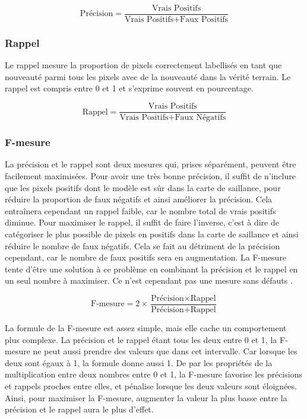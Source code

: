 	\begin{equation}
		\text{Précision} = \frac{\text{Vrais Positifs}}{\text{Vrais Positifs} + \text{Faux Positifs}}
	\end{equation}

	\subsubsection{Rappel}

	Le rappel mesure la proportion de pixels correctement labellisés en tant que nouveauté parmi tous les pixels avec de la nouveauté dans la vérité terrain. Le rappel est compris entre 0 et 1 et s'exprime souvent en pourcentage.

	\begin{equation}
		\text{Rappel} = \frac{\text{Vrais Positifs}}{\text{Vrais Positifs} + \text{Faux Négatifs}}
	\end{equation}

	\subsubsection{F-mesure}

	La précision et le rappel sont deux mesures qui, prises séparément, peuvent être facilement maximisées. Pour avoir une très bonne précision, il suffit de n'inclure que les pixels positifs dont le modèle est sûr dans la carte de saillance, pour réduire la proportion de faux négatifs et ainsi améliorer la précision. Cela entraînera cependant un rappel faible, car le nombre total de vrais positifs diminue. Pour maximiser le rappel, il suffit de faire l'inverse, c'est à dire de catégoriser le plus possible de pixels en positifs dans la carte de saillance et ainsi réduire le nombre de faux négatifs. Cela se fait au détriment de la précision cependant, car le nombre de faux positifs sera en augmentation. La F-mesure \cite{hripcsak-fmeasure} tente d'être une solution à ce problème en combinant la précision et le rappel en un seul nombre à maximiser. Ce n'est cependant pas une mesure sans défauts \cite{powers-fmeasure}.

	\begin{equation}
		\text{F-mesure} = 2 \times \frac{\text{Précision} \times \text{Rappel}}{\text{Précision}+\text{Rappel}}
	\end{equation}

	La formule de la F-mesure est assez simple, mais elle cache un comportement plus complexe. La précision et le rappel étant tous les deux entre 0 et 1, la F-mesure ne peut aussi prendre des valeurs que dans cet intervalle. Car lorsque les deux sont égaux à 1, la formule donne aussi 1. De par les propriétés de la multiplication entre deux nombres entre 0 et 1, la F-mesure favorise les précisions et rappels proches entre elles, et pénalise lorsque les deux valeurs sont éloignées. Ainsi, pour maximiser la F-mesure, augmenter la valeur la plus basse entre la précision et le rappel aura le plus d'effet.
	
